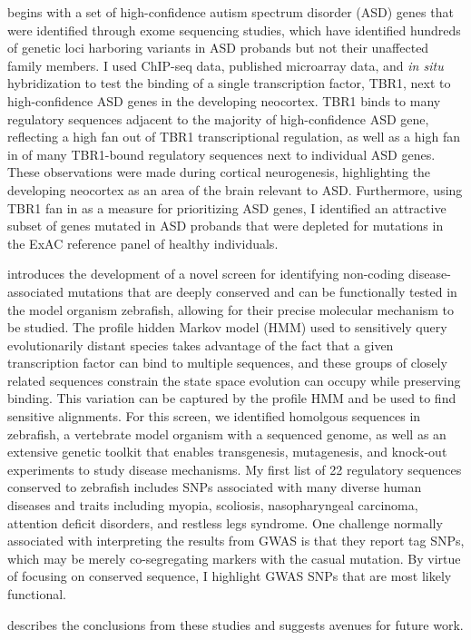  begins with a set of high-confidence autism spectrum disorder (ASD) genes that were identified through exome sequencing studies, which have identified hundreds of genetic loci harboring variants in ASD probands but not their unaffected family members. I used ChIP-seq data, published microarray data, and \emph{in situ} hybridization to test the binding of a single transcription factor, TBR1, next to high-confidence ASD genes in the developing neocortex. TBR1 binds to many regulatory sequences adjacent to the majority of high-confidence ASD gene, reflecting a high fan out of TBR1 transcriptional regulation, as well as a high fan in of many TBR1-bound regulatory sequences next to individual ASD genes. These observations were made during cortical neurogenesis, highlighting the developing neocortex as an area of the brain relevant to ASD. Furthermore, using TBR1 fan in as a measure for prioritizing ASD genes, I identified an attractive subset of genes mutated in ASD probands that were depleted for mutations in the ExAC reference panel of healthy individuals.

 introduces the development of a novel screen for identifying non-coding disease-associated mutations that are deeply conserved and can be functionally tested in the model organism zebrafish, allowing for their precise molecular mechanism to be studied. The profile hidden Markov model (HMM) used to sensitively query evolutionarily distant species takes advantage of the fact that a given transcription factor can bind to multiple sequences, and these groups of closely related sequences constrain the state space evolution can occupy while preserving binding. This variation can be captured by the profile HMM and be used to find sensitive alignments. For this screen, we identified homolgous sequences in zebrafish, a vertebrate model organism with a sequenced genome, as well as an extensive genetic toolkit that enables transgenesis, mutagenesis, and knock-out experiments to study disease mechanisms. My first list of 22 regulatory sequences conserved to zebrafish includes SNPs  associated with many diverse human diseases and traits including myopia, scoliosis, nasopharyngeal carcinoma, attention deficit disorders, and restless legs syndrome. One challenge normally associated with interpreting the results from GWAS is that they report tag SNPs, which may be merely co-segregating markers with the casual mutation. By virtue of focusing on conserved sequence, I highlight GWAS SNPs that are most likely functional.

 describes the conclusions from these studies and suggests avenues for future work.